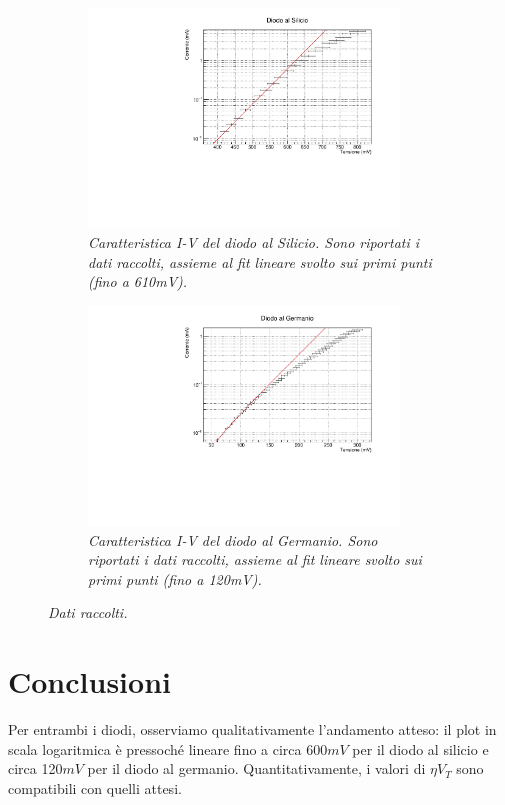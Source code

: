 \documentclass[11pt, a4paper, twoside]{article}
\begin{document}
  \begin{figure}%
    \centering
    \begin{subfigure}[t]{.47\textwidth}
      \includegraphics[width=8.25cm]{./assets/1/Silicio2.pdf}
      \caption{
        \emph{
          Caratteristica I-V del diodo al Silicio. Sono riportati i dati raccolti, assieme al fit lineare svolto sui primi punti (fino a 610mV).
        }
      }
      \label{fig:caratteristica-silicio}
    \end{subfigure}
    \hspace{5mm}
    \begin{subfigure}[t]{.47\textwidth}
      \includegraphics[width=8.25cm]{./assets/1/Germanio2.pdf}
      \caption{
        \emph{
           Caratteristica I-V del diodo al Germanio. Sono riportati i dati raccolti, assieme al fit lineare svolto sui primi punti (fino a 120mV).
        }
      }
      \label{fig:caratteristica-germanio}
    \end{subfigure}
    \caption{\emph{Dati raccolti.}
    \label{fig:caratteristiche-iv}}
  \end{figure}

\section{Conclusioni}\label{sec:conclusioni}
  Per entrambi i diodi, osserviamo qualitativamente l'andamento atteso: il plot in scala logaritmica
  è pressoché lineare fino a circa 600$mV$ per il diodo al silicio e circa 120$mV$ per il diodo al germanio.
  Quantitativamente, i valori di $\eta V_T$ sono compatibili con quelli attesi.
\end{document}
